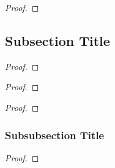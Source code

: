 \begin{proof}
    \lipsum[1]
\end{proof}

\subsection{Subsection Title}

\begin{defn}
    \lipsum[1]
\end{defn}

\begin{exmp}
    \lipsum[1]
\end{exmp}

\begin{lemm}
    \lipsum[1]
\end{lemm}

\begin{proof}
    \lipsum[1]
\end{proof}

\begin{exmp}
    \lipsum[1]
\end{exmp}

\begin{thrm}
    \lipsum[1]
\end{thrm}

\begin{proof}
    \lipsum[1]
\end{proof}

\begin{exmp}
    \lipsum[1]
\end{exmp}

\begin{coro}
    \lipsum[1]
\end{coro}

\begin{proof}
    \lipsum[1]
\end{proof}

\subsubsection{Subsubsection Title}

\begin{defn}
    \lipsum[1]
\end{defn}

\begin{lemm}
    \lipsum[1]
\end{lemm}

\begin{proof}
    \lipsum[1]
\end{proof}

